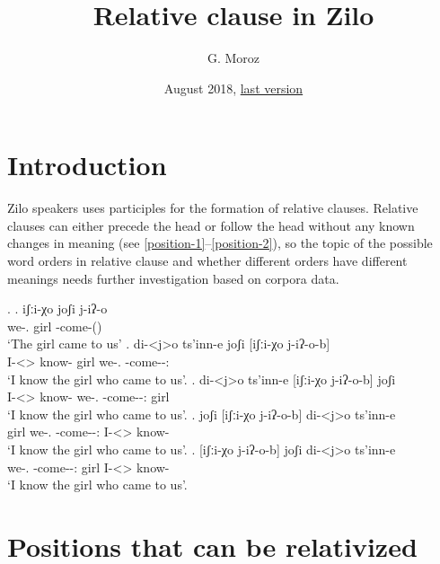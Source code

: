 
\title{\Large Relative clause in Zilo}
\author{G. Moroz}
\date{August 2018, \href{https://github.com/agricolamz/2018_Andi_relative_clause/raw/master/2018.08_Moroz_Zilo_Relative_clouse.pdf}{last version}}
 
\maketitle

\section{Introduction}
Zilo speakers uses participles for the formation of relative clauses. Relative clauses can either precede the head or follow the head without any known changes in meaning (see \ref{position-1}--\ref{position-2}), so the topic of the possible word orders in relative clause and whether different orders have different meanings needs further investigation based on corpora data.

\ex. 
	\ag. iʃːi-χo joʃi j-iʔ-o\\
		 {we-\Add.\Lat} {girl} {\F-come-\Pst(\Aor)}\\
		 \glt    `The girl came to us'
	\bg. di-<j>o ts'inn-e joʃi [iʃːi-χo j-iʔ-o-b]\\
		 {I-<\F>\Aff} {know-\Hab} {girl} {we-\Add.\Lat} {\F-come-\Pst-\Ptcp:\Pst}\\
		 \glt    `I know the girl who came to us'. \label{position-1}
	\bg. di-<j>o ts'inn-e [iʃːi-χo j-iʔ-o-b] joʃi \\
		 {I-<\F>\Aff} {know-\Hab} {we-\Add.\Lat} {\F-come-\Pst-\Ptcp:\Pst} {girl}\\
		 \glt    `I know the girl who came to us'.
	\bg. joʃi  [iʃːi-χo j-iʔ-o-b] di-<j>o ts'inn-e \\
		  {girl}  {we-\Add.\Lat} {\F-come-\Pst-\Ptcp:\Pst} {I-<\F>\Aff} {know-\Hab}\\
		 \glt    `I know the girl who came to us'.
	\bg. [iʃːi-χo j-iʔ-o-b] joʃi di-<j>o ts'inn-e \\
		  {we-\Add.\Lat} {\F-come-\Pst-\Ptcp:\Pst} {girl} {I-<\F>\Aff} {know-\Hab}\\
		 \glt    `I know the girl who came to us'. \label{position-2}

\section{Positions that can be relativized}

